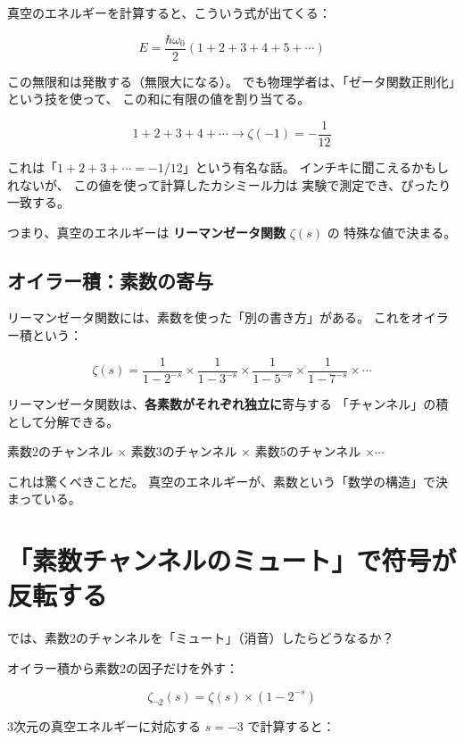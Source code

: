 \documentclass[12pt,a4paper]{article}
\begin{document}
真空のエネルギーを計算すると、こういう式が出てくる：

$$
E = \frac{\hbar\omega_0}{2}(1 + 2 + 3 + 4 + 5 + \cdots)
$$

この無限和は発散する（無限大になる）。
でも物理学者は、「ゼータ関数正則化」という技を使って、
この和に有限の値を割り当てる。

$$
1 + 2 + 3 + 4 + \cdots \longrightarrow \zeta(-1) = -\frac{1}{12}
$$

これは「$1+2+3+\cdots = -1/12$」という有名な話。
インチキに聞こえるかもしれないが、
この値を使って計算したカシミール力は
実験で測定でき、ぴったり一致する。

つまり、真空のエネルギーは
\textbf{リーマンゼータ関数} $\zeta(s)$ の
特殊な値で決まる。

\subsection{オイラー積：素数の寄与}

リーマンゼータ関数には、素数を使った「別の書き方」がある。
これをオイラー積という：

$$
\zeta(s) = \frac{1}{1-2^{-s}} \times \frac{1}{1-3^{-s}} \times \frac{1}{1-5^{-s}} \times \frac{1}{1-7^{-s}} \times \cdots
$$

\begin{keybox}[オイラー積の意味]
リーマンゼータ関数は、\textbf{各素数がそれぞれ独立に}寄与する
「チャンネル」の積として分解できる。

素数2のチャンネル $\times$ 素数3のチャンネル $\times$ 素数5のチャンネル $\times \cdots$
\end{keybox}

これは驚くべきことだ。
真空のエネルギーが、素数という「数学の構造」で決まっている。

\section{「素数チャンネルのミュート」で符号が反転する}

では、素数2のチャンネルを「ミュート」（消音）したらどうなるか？

オイラー積から素数2の因子だけを外す：

$$
\zeta_{\neg 2}(s) = \zeta(s) \times (1 - 2^{-s})
$$

3次元の真空エネルギーに対応する $s = -3$ で計算すると：
\end{document}
